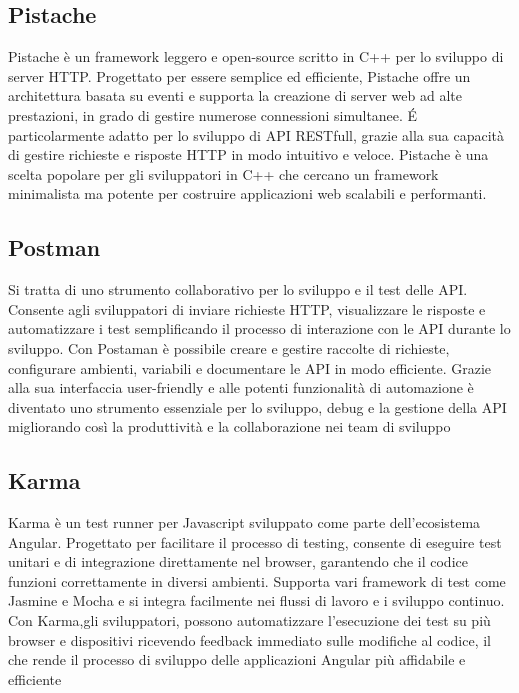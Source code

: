 \documentclass[a4paper, 11pt,oneside]{book}
\begin{document}
        \subsection{Pistache}
            Pistache è un framework leggero e open-source scritto in C++ per lo sviluppo di server HTTP. Progettato per essere semplice ed efficiente, Pistache offre un architettura basata su eventi e supporta la creazione di server web ad alte prestazioni,
            in grado di gestire numerose connessioni simultanee. \'E particolarmente adatto per lo sviluppo di API RESTfull, grazie alla sua capacità di gestire richieste e risposte HTTP in modo intuitivo e veloce. Pistache è una scelta popolare per gli sviluppatori 
            in C++ che cercano un framework minimalista ma potente per costruire applicazioni web scalabili e performanti.
        \subsection{Postman}
            Si tratta di uno strumento collaborativo per lo sviluppo e il test delle API. Consente agli sviluppatori di inviare richieste HTTP, visualizzare le risposte e automatizzare i test semplificando il processo di interazione con le API durante lo sviluppo.
            Con Postaman è possibile creare e gestire raccolte di richieste, configurare ambienti, variabili e documentare le API in modo efficiente. Grazie alla sua interfaccia user-friendly e alle potenti funzionalità di automazione è diventato uno strumento essenziale 
            per lo sviluppo, debug e la gestione della API migliorando così la produttività e la collaborazione nei team di sviluppo
        \subsection{Karma}
            Karma è un test runner per Javascript sviluppato come parte dell'ecosistema Angular. Progettato per facilitare il processo di testing, consente di eseguire test unitari e di integrazione direttamente nel browser, garantendo che il codice funzioni correttamente
            in diversi ambienti. Supporta vari framework di test come Jasmine e Mocha e si integra facilmente nei flussi di lavoro e i sviluppo continuo. Con Karma,gli sviluppatori, possono automatizzare l'esecuzione dei test su più browser e dispositivi ricevendo feedback immediato
            sulle modifiche al codice, il che rende il processo di sviluppo delle applicazioni Angular più affidabile e efficiente
\end{document}
